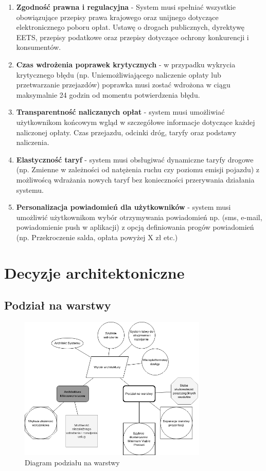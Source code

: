 \documentclass[12pt]{article}
\begin{document}
\begin{enumerate}
    \item \textbf{Zgodność prawna i regulacyjna} - System musi spełniać wszystkie obowiązujące przepisy prawa krajowego oraz unijnego dotyczące elektronicznego poboru opłat. Ustawę o drogach publicznych, dyrektywę EETS, przepisy podatkowe oraz przepisy dotyczące ochrony konkurencji i konsumentów.

    \item \textbf{Czas wdrożenia poprawek krytycznych} - w przypadku wykrycia krytycznego błędu (np. Uniemożliwiającego naliczenie opłaty lub przetwarzanie przejazdów) poprawka musi zostać wdrożona w ciągu maksymalnie 24 godzin od momentu potwierdzenia błędu.

    \item \textbf{Transparentność naliczanych opłat} - system musi umożliwiać użytkownikom końcowym wgląd w szczegółowe informacje dotyczące każdej naliczonej opłaty. Czas przejazdu, odcinki dróg, taryfy oraz podstawy naliczenia.

    \item \textbf{Elastyczność taryf} - system musi obsługiwać dynamiczne taryfy drogowe (np. Zmienne w zależności od natężenia ruchu czy poziomu emisji pojazdu) z możliwoścą wdrażania nowych taryf bez konieczności przerywania działania systemu.

    \item \textbf{Personalizacja powiadomień dla użytkowników} - system musi umożliwić użytkownikom wybór otrzymywania powiadomień np. (sms, e-mail, powiadomienie push w aplikacji) z opcją definiowania progów powiadomień (np. Przekroczenie salda, opłata powyżej X zł etc.)
\end{enumerate}

\section{Decyzje architektoniczne}

\subsection{Podział na warstwy}
\begin{figure}[H]
\centering
\includegraphics[width=0.8\textwidth]{wybor_architektury.png}
\caption{Diagram podziału na warstwy}
\label{fig:layers}
\end{figure}
\end{document}
